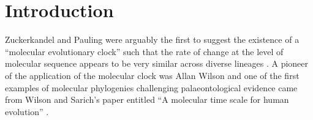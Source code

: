 \section{Introduction} 
Zuckerkandel and Pauling were arguably the first to suggest the existence of a ``molecular evolutionary clock'' such that the rate of change at the level of molecular sequence appears to be very similar across diverse lineages \cite{zuckerkandl1965}. A pioneer of the application of the molecular clock was Allan Wilson and one of the first examples of molecular phylogenies challenging palaeontological evidence came from Wilson and Sarich's paper entitled ``A molecular time scale for human evolution'' \cite{wilsonSarich1969}.
  
  
  
  
  